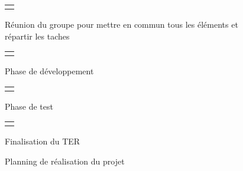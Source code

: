 \begin{landscape}
\begin{figure}[h!]
\hspace{7.3cm} \noindent \begin{tabular}{l}
     \rowcolor{blue} \\  
\end{tabular}
Réunion du groupe pour mettre en commun tous les éléments et répartir les taches 

\hspace{7.3cm} \noindent \begin{tabular}{l}
     \rowcolor{orange} \\  
\end{tabular}
Phase de développement

\hspace{7.3cm} \noindent \begin{tabular}{l}
     \rowcolor{cyan} \\  
\end{tabular}
Phase de test

\hspace{7.3cm} \noindent \begin{tabular}{l}
     \rowcolor{yellow} \\  
\end{tabular}
Finalisation du TER \\
\caption{Planning de réalisation du projet}
\end{figure}
\end{landscape}